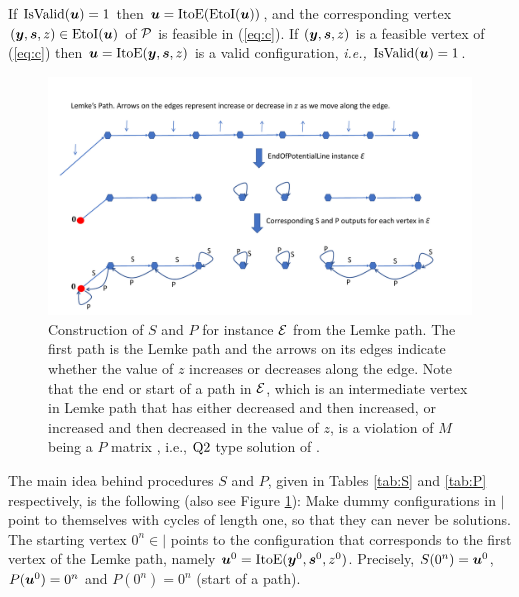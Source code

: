 \begin{lemma}\label{lem:vert}
If $\mbox{IsValid}(\mbox{\boldmath $u$})=1$ then $\mbox{\boldmath $u$}=\mbox{ItoE}(\mbox{EtoI}(\mbox{\boldmath $u$}))$, and the corresponding vertex $(\mbox{\boldmath $y$},\mbox{\boldmath $s$},z)\in \mbox{EtoI}(\mbox{\boldmath $u$})$ of $\mbox{${\mathcal P}$}$ is feasible in (\ref{eq:c}). If $(\mbox{\boldmath $y$},\mbox{\boldmath $s$},z)$ is a feasible vertex of (\ref{eq:c}) then $\mbox{\boldmath $u$}=\mbox{ItoE}(\mbox{\boldmath $y$},\mbox{\boldmath $s$},z)$ is a valid configuration, {\em i.e.,} $\mbox{IsValid}(\mbox{\boldmath $u$})=1$.
\end{lemma}

\begin{figure}[htbp]
   \centering
\vspace{-1cm}

  \includegraphics[width=\textwidth]{plcp-fig.pdf}
 \caption{Construction of $S$ and $P$ for \EOPL instance $\mbox{${\mathcal E}$}$ from the Lemke
 	path. The first path is the Lemke path and the arrows on its edges indicate
 	whether the value of $z$ increases or decreases along the edge.  Note that
 	the end or start of a path in $\mbox{${\mathcal E}$}$, which is an intermediate vertex in
 	Lemke path that has either decreased and then increased, or increased and then
 	decreased in the value of $z$, is a violation of $M$ being a $P$ matrix
 	\cite{cottle2009linear}, i.e., $\mbox{Q2}$ type solution of
 	\PLCP.}
 	\label{fig:path}
\end{figure}   


The main idea behind procedures $S$ and $P$, given in Tables \ref{tab:S} and
\ref{tab:P} respectively, is the following (also see Figure \ref{fig:path}):
Make dummy configurations in $\vert$ point to themselves with cycles of
length one, so that they can never be solutions. 
The starting vertex $0^n \in \vert$ points to the configuration that corresponds
to the first vertex of the Lemke path, namely $\mbox{\boldmath $u$}^0=\mbox{ItoE}(\mbox{\boldmath $y$}^0,\mbox{\boldmath $s$}^0,z^0)$. 
Precisely, $S(0^n)=\mbox{\boldmath $u$}^0$, $P(\mbox{\boldmath $u$}^0)=0^n$ and $P(0^n)=0^n$ (start of
a path). 


